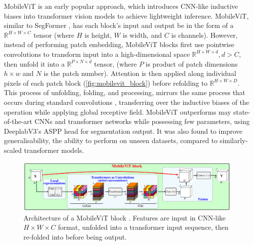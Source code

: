 \documentclass[a4paper,12pt]{report}
\begin{document}
MobileViT \cite{mehta_mobilevit_2022} is an early popular approach, which introduces CNN-like inductive biases into transformer vision models to achieve lightweight inference. MobileViT, similar to SegFormer \cite{xie_segformer_2021}, has each block's input and output be in the form of a $\mathbb{R}^{H \times W \times C}$ tensor (where $H$ is height, $W$ is width, and $C$ is channels). However, instead of performing patch embedding, MobileViT blocks first use pointwise convolutions to transform input into a high-dimensional space $\mathbb{R}^{H \times W \times d}, d > C$, then unfold it into a $\mathbb{R}^{P \times N \times d}$ tensor, (where $P$ is product of patch dimensions $h \times w$ and $N$ is the patch number). Attention is then applied along individual pixels of each patch block (\autoref{fig:mobilevit_block}) before refolding to $\mathbb{R}^{H \times W \times D}$. This process of unfolding, folding, and processing, mirrors the same process that occurs during standard convolutions \cite{contributors_unfold_nodate}, transferring over the inductive biases of the operation while applying global receptive field. MobileViT outperforms may state-of-the-art CNNs and transformer networks while possessing few parameters, using DeeplabV3's ASPP head \cite{chen_rethinking_2017} for segmentation output. It was also found to improve generalisability, the ability to perform on unseen datasets, compared to similarly-scaled transformer models.

\begin{figure}[t!]
    \centering
    \includegraphics[width=\textwidth]{res/mobilevit-block.png}
    \caption{Architecture of a MobileViT block \cite{mehta_mobilevit_2022}. Features are input in CNN-like $H \times W \times C$ format, unfolded into a transformer input sequence, then re-folded into before being output.}
    \label{fig:mobilevit_block}
\end{figure}
\end{document}
